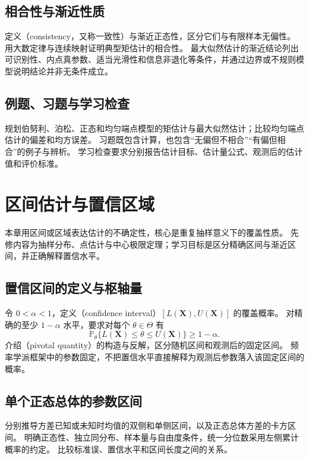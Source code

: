 \documentclass[UTF8,12pt,a4paper,fontset=fandol]{ctexbook}
\begin{document}
\section{相合性与渐近性质}
\label{sec:ps-estimation-asymptotics}
定义（consistency，又称一致性）与渐近正态性，区分它们与有限样本无偏性。
用大数定律与连续映射证明典型矩估计的相合性。
最大似然估计的渐近结论列出可识别性、内点真参数、适当光滑性和信息非退化等条件，并通过边界或不规则模型说明结论并非无条件成立。

\section{例题、习题与学习检查}
规划伯努利、泊松、正态和均匀端点模型的矩估计与最大似然估计；比较均匀端点估计的偏差和均方误差。
习题既包含计算，也包含“无偏但不相合”“有偏但相合”的例子与辨析。
学习检查要求分别报告估计目标、估计量公式、观测后的估计值和评价标准。


\chapter{区间估计与置信区域}
\label{chap:ps-intervals}

本章用区间或区域表达估计的不确定性，核心是重复抽样意义下的覆盖性质。
先修内容为抽样分布、点估计与中心极限定理；学习目标是区分精确区间与渐近区间，并正确解释置信水平。

\section{置信区间的定义与枢轴量}
\label{sec:ps-confidence-definition}
令 $0<\alpha<1$，定义（confidence interval）$[L(\mathbf X),U(\mathbf X)]$ 的覆盖概率。
对精确的至少 $1-\alpha$ 水平，要求对每个 $\theta\in\Theta$ 有
\begin{equation}
  \mathbb P_\theta\{L(\mathbf X)\leq\theta\leq U(\mathbf X)\}\geq1-\alpha.
  \label{eq:ps-confidence-coverage}
\end{equation}
介绍（pivotal quantity）的构造与反解，区分随机区间和观测后的固定区间。
频率学派框架中的参数固定，不把置信水平直接解释为观测后参数落入该固定区间的概率。

\section{单个正态总体的参数区间}
\label{sec:ps-normal-intervals}
分别推导方差已知或未知时均值的双侧和单侧区间，以及正态总体方差的卡方区间。
明确正态性、独立同分布、样本量与自由度条件，统一分位数采用左侧累计概率的约定。
比较标准误、置信水平和区间长度之间的关系。
\end{document}
